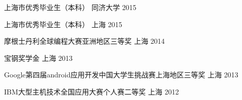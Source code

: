 


\begin{cvhonors}

\cvhonor
{上海市优秀毕业生（本科）} %
{} %
{同济大学} %
{2015} %


\cvhonor
{上海市优秀毕业生（本科）} %
{} %
{上海} %
{2015} %

\cvhonor
{摩根士丹利全球编程大赛亚洲地区三等奖} %
{} %
{上海} %
{2014} %

\cvhonor
{宝钢奖学金} %
{} %
{上海} %
{2013} %

\cvhonor
{Google第四届android应用开发中国大学生挑战赛上海地区三等奖} %
{} %
{上海} %
{2013} %

\cvhonor
{IBM大型主机技术全国应用大赛个人赛二等奖} %
{} %
{上海} %
{2012} %


\end{cvhonors}